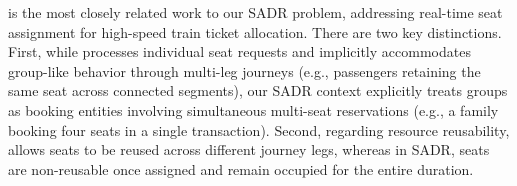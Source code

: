 

 
\cite{zhu2023assign} is the most closely related work to our SADR problem, addressing real-time seat assignment for high-speed train ticket allocation. There are two key distinctions. First, while \cite{zhu2023assign} processes individual seat requests and implicitly accommodates group-like behavior through multi-leg journeys (e.g., passengers retaining the same seat across connected segments), our SADR context explicitly treats groups as booking entities involving simultaneous multi-seat reservations (e.g., a family booking four seats in a single transaction). Second, regarding resource reusability, \cite{zhu2023assign} allows seats to be reused across different journey legs, whereas in SADR, seats are non-reusable once assigned and remain occupied for the entire duration.



